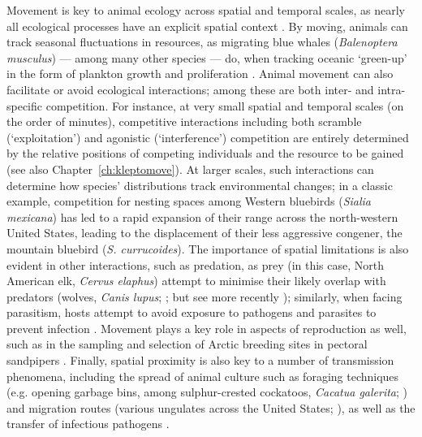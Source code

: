 Movement is key to animal ecology across spatial and temporal scales, as nearly all ecological processes have an explicit spatial context \citep{nathan2008a}.
By moving, animals can track seasonal fluctuations in resources, as migrating blue whales (\emph{Balenoptera musculus}) --- among many other species --- do, when tracking oceanic `green-up' in the form of plankton growth and proliferation \parencite{abrahms2021a,abrahms2019}.
Animal movement can also facilitate or avoid ecological interactions; among these are both inter- and intra-specific competition.
For instance, at very small spatial and temporal scales (on the order of minutes), competitive interactions including both scramble (`exploitation') and agonistic (`interference') competition \parencite[][]{keddy2001,birch1957} are entirely determined by the relative positions of competing individuals and the resource to be gained (see also Chapter~\ref{ch:kleptomove}).
At larger scales, such interactions can determine how species' distributions track environmental changes; in a classic example, competition for nesting spaces among Western bluebirds (\emph{Sialia mexicana}) has led to a rapid expansion of their range across the north-western United States, leading to the displacement of their less aggressive congener, the mountain bluebird (\emph{S. currucoides}).
The importance of spatial limitations is also evident in other interactions, such as predation, as prey (in this case, North American elk, \emph{Cervus elaphus}) attempt to minimise their likely overlap with predators (wolves, \emph{Canis lupus}; \cite{fortin2005}; but see more recently \cite{kohl2018}); similarly, when facing parasitism, hosts attempt to avoid exposure to pathogens and parasites to prevent infection \citep{weinstein2018}.
Movement plays a key role in aspects of reproduction as well, such as in the sampling and selection of Arctic breeding sites in pectoral sandpipers \parencite[\emph{Calidris melanotos};][]{kempenaers2017}.
Finally, spatial proximity is also key to a number of transmission phenomena, including the spread of animal culture such as foraging techniques (e.g. opening garbage bins, among sulphur-crested cockatoos, \emph{Cacatua galerita}; \cite{klump2021}) and migration routes (various ungulates across the United States; \cite{jesmer2018}), as well as the transfer of infectious pathogens \citep[][see also Chapter~\ref{ch:pathomove}]{weinstein2018,monk2022,stroeymeyt2018}.

